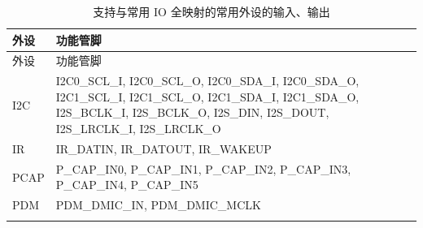 \documentclass[
  12pt,
]{book}
\begin{document}
\begin{longtable}[]{@{}ll@{}}
\caption{\label{tab:ch-pinctrl-common-set} 支持与常用 IO 全映射的常用外设的输入、输出}\tabularnewline
\toprule
\begin{minipage}[b]{0.09\columnwidth}\raggedright
外设\strut
\end{minipage} & \begin{minipage}[b]{0.85\columnwidth}\raggedright
功能管脚\strut
\end{minipage}\tabularnewline
\midrule
\endfirsthead
\toprule
\begin{minipage}[b]{0.09\columnwidth}\raggedright
外设\strut
\end{minipage} & \begin{minipage}[b]{0.85\columnwidth}\raggedright
功能管脚\strut
\end{minipage}\tabularnewline
\midrule
\endhead
\begin{minipage}[t]{0.09\columnwidth}\raggedright
I2C\strut
\end{minipage} & \begin{minipage}[t]{0.85\columnwidth}\raggedright
I2C0\_SCL\_I, I2C0\_SCL\_O, I2C0\_SDA\_I, I2C0\_SDA\_O, I2C1\_SCL\_I, I2C1\_SCL\_O, I2C1\_SDA\_I, I2C1\_SDA\_O, I2S\_BCLK\_I, I2S\_BCLK\_O, I2S\_DIN, I2S\_DOUT, I2S\_LRCLK\_I, I2S\_LRCLK\_O\strut
\end{minipage}\tabularnewline
\begin{minipage}[t]{0.09\columnwidth}\raggedright
IR\strut
\end{minipage} & \begin{minipage}[t]{0.85\columnwidth}\raggedright
IR\_DATIN, IR\_DATOUT, IR\_WAKEUP\strut
\end{minipage}\tabularnewline
\begin{minipage}[t]{0.09\columnwidth}\raggedright
PCAP\strut
\end{minipage} & \begin{minipage}[t]{0.85\columnwidth}\raggedright
P\_CAP\_IN0, P\_CAP\_IN1, P\_CAP\_IN2, P\_CAP\_IN3, P\_CAP\_IN4, P\_CAP\_IN5\strut
\end{minipage}\tabularnewline
\begin{minipage}[t]{0.09\columnwidth}\raggedright
PDM\strut
\end{minipage} & \begin{minipage}[t]{0.85\columnwidth}\raggedright
PDM\_DMIC\_IN, PDM\_DMIC\_MCLK\strut
\end{minipage}\tabularnewline
\begin{minipage}[t]{0.09\columnwidth}\raggedright

\end{minipage}
\end{longtable}
\end{document}
